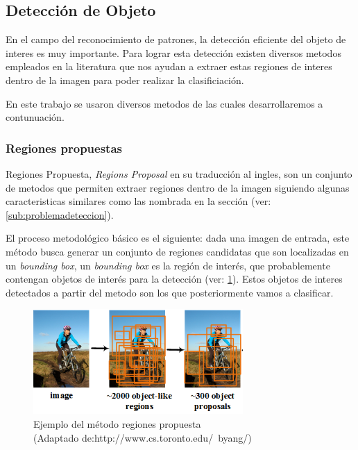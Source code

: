 \subsection{Detección de Objeto}\label{sub: detecciondeobjeto}
En el campo del reconocimiento de patrones, la detección eficiente del objeto de interes es muy importante. Para lograr esta detección existen diversos metodos empleados en la literatura que nos ayudan a extraer estas regiones de interes dentro de la imagen para poder realizar la clasificiación. 

En este trabajo se usaron diversos metodos de las cuales desarrollaremos a contunuación.

\subsubsection{Regiones propuestas}\label{sub: regionespropuesta}

Regiones Propuesta, \textit{Regions Proposal} en su traducción al ingles, son un conjunto de metodos que permiten extraer regiones dentro de la imagen siguiendo algunas caracteristicas similares como las nombrada en la sección (ver:\ref{sub:problemadeteccion}). 

El proceso metodológico básico es el siguiente: dada una imagen de entrada, este método busca generar un conjunto de regiones candidatas que son localizadas en un \textit{bounding box}, un \textit{bounding box} es la región de interés, que probablemente contengan objetos de interés para la detección (ver: \ref{Fig: propsalregion}). Estos objetos de interes detectados a partir del metodo son los que posteriormente vamos a clasificar.

\begin{figure}[H]
 \centering
  \includegraphics[height=4cm,keepaspectratio=true,clip=true]{imagenes/Logos/regionProposal.png}
  \caption{Ejemplo del método regiones propuesta \\ (Adaptado de:{http://www.cs.toronto.edu/~byang/})}
	\label{Fig: propsalregion}
\end{figure}

